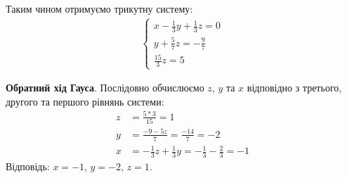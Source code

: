 Таким чином отримуємо трикутну систему:
\begin{align*}
    \begin{cases}
        x - \frac{1}{3}y + \frac{1}{3}z = 0 \\
        y + \frac{5}{7}z = -\frac{9}{7}     \\
        \frac{15}{3}z = 5
    \end{cases}
\end{align*}

\textbf{Обратний хід Гауса}.
Послідовно обчислюємо $z$, $y$ та $x$
відповідно з третього, другого та першого рівнянь системи:
\begin{align*}
    z & = \frac{5 * 3}{15} = 1                                           \\
    y & = \frac{-9 - 5z}{7} = \frac{-14}{7} = -2                         \\
    x & = -\frac{1}{3}z + \frac{1}{3}y = -\frac{1}{3} - \frac{2}{3} = -1
\end{align*}
Відповідь: $x = -1$, $y = -2$, $z = 1$.
